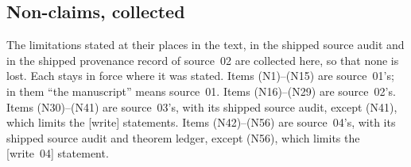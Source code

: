 \documentclass[11pt]{article}
\theoremstyle{definition}
\theoremstyle{remark}
\begin{document}
\subsection{Non-claims, collected}\label{isg:sec:nonclaims}
The limitations stated at their places in the text, in the shipped
source audit and in the shipped provenance record of source~02 are
collected here, so that none is lost. Each stays in force where it was
stated. Items \textup{(N1)}--\textup{(N15)} are source~01's; in them
``the manuscript'' means source~01. Items \textup{(N16)}--\textup{(N29)}
are source~02's. Items \textup{(N30)}--\textup{(N41)} are source~03's,
with its shipped source audit, except \textup{(N41)}, which limits the
\textup{[write]} statements. Items \textup{(N42)}--\textup{(N56)} are
source~04's, with its shipped source audit and theorem ledger, except
\textup{(N56)}, which limits the \textup{[write~04]} statement.
\end{document}
